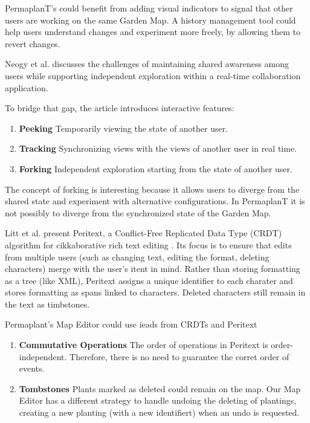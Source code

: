 \documentclass[final,oneside]{vutinfth}
\begin{document}
PermaplanT's could benefit from adding visual indicators to signal that other users are working on the same Garden Map.
A history management tool could help users understand changes and experiment more freely, by allowing them to revert changes.

Neogy et al. discusses the challenges of maintaining shared awareness among users while supporting independent exploration within a real-time collaboration application. \cite{collaboration_visualizations} 

To bridge that gap, the article introduces interactive features:
\begin{enumerate}
    \item \textbf{Peeking} Temporarily viewing the state of another user.
    \item \textbf{Tracking} Synchronizing views with the views of another user in real time.
    \item \textbf{Forking} Independent exploration starting from the state of another user.
\end{enumerate}

The concept of forking is interesting because it allows users to diverge from the shared state and experiment with alternative configurations.
In PermaplanT it is not possibly to diverge from the synchronized state of the Garden Map.

Litt et al. present Peritext, a Conflict-Free Replicated Data Type (CRDT) algorithm for cikkaborative rich text editing \cite{peritext}.
Its focus is to ensure that edits from multiple users (such as changing text, editing the format, deleting characters) merge with the user's itent in mind.
Rather than storing formatting as a tree (like XML), Peritext assigns a unique identifier to each charater and stores formatting as spans linked to characters.
Deleted characters still remain in the text as timbstones.

Permaplant's Map Editor could use ieads from CRDTs and Peritext
\begin{enumerate}
    \item \textbf{Commutative Operations} The order of operations in Peritext is order-independent.
    Therefore, there is no need to guarantee the corret order of events.
    \item \textbf{Tombstones} Plants marked as deleted could remain on the map.
    Our Map Editor has a different strategy to handle undoing the deleting of plantings, creating a new planting (with a new identifiert) when an undo is requested.
\end{enumerate}

\printglossary[type=\acronymtype,title=Acronyms]

\backmatter



\end{document}
